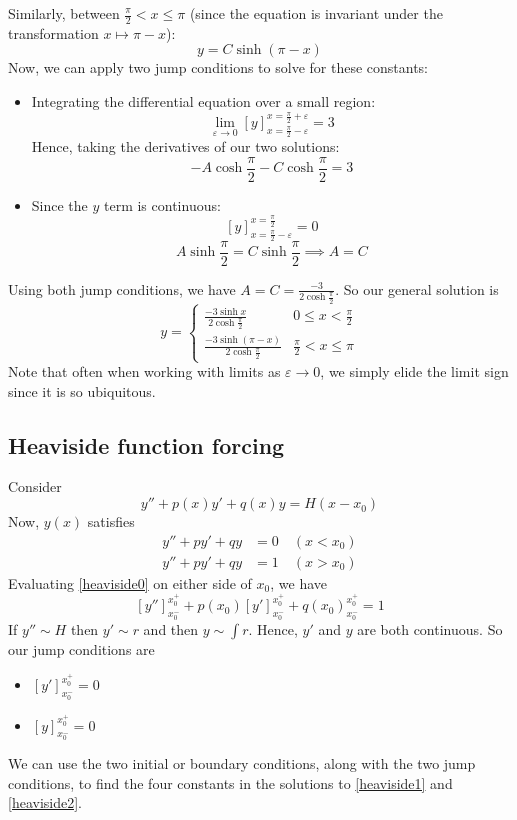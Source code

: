 Similarly, between \(\frac{\pi}{2} < x \leq \pi\) (since the equation is invariant under the transformation \(x \mapsto \pi - x\)):
\[
	y = C \sinh (\pi - x)
\]
Now, we can apply two jump conditions to solve for these constants:
\begin{itemize}
	\item Integrating the differential equation over a small region:
	      \[
		      \lim_{\varepsilon \to 0} [y]_{x = \frac{\pi}{2} - \varepsilon}^{x = \frac{\pi}{2} + \varepsilon} = 3
	      \]
	      Hence, taking the derivatives of our two solutions:
	      \[
		      -A\cosh\frac{\pi}{2} - C\cosh\frac{\pi}{2} = 3
	      \]
	\item Since the \(y\) term is continuous:
	      \[
		      [y]_{x = \frac{\pi}{2} - \varepsilon}^{x = \frac{\pi}{2}} = 0
	      \]
	      \[
		      A \sinh \frac{\pi}{2} = C \sinh \frac{\pi}{2} \implies A = C
	      \]
\end{itemize}
Using both jump conditions, we have \(A = C = \frac{-3}{2\cosh \frac{\pi}{2}}\).
So our general solution is
\[
	y = \begin{cases}
		\frac{-3\sinh x}{2\cosh \frac{\pi}{2}}         & 0 \leq x < \frac{\pi}{2}   \\
		\frac{-3\sinh (\pi - x)}{2\cosh \frac{\pi}{2}} & \frac{\pi}{2} < x \leq \pi
	\end{cases}
\]
Note that often when working with limits as \(\varepsilon \to 0\), we simply elide the limit sign since it is so ubiquitous.

\subsection{Heaviside function forcing}
Consider
\begin{equation}\label{heaviside0}
	y'' + p(x)y' + q(x)y = H(x - x_0)
\end{equation}
Now, \(y(x)\) satisfies
\begin{align}
	y'' + py' + qy & = 0\quad (x<x_0) \label{heaviside1} \\
	y'' + py' + qy & = 1\quad (x>x_0) \label{heaviside2}
\end{align}
Evaluating \eqref{heaviside0} on either side of \(x_0\), we have
\[
	[y'']_{x_0^-}^{x_0^+} + p(x_0)[y']_{x_0^-}^{x_0^+} + q(x_0)_{x_0^-}^{x_0^+} = 1
\]
If \(y'' \sim H\) then \(y' \sim r\) and then \(y \sim \int r\).
Hence, \(y'\) and \(y\) are both continuous.
So our jump conditions are
\begin{itemize}
	\item \([y']_{x_0^-}^{x_0^+} = 0\)
	\item \([y]_{x_0^-}^{x_0^+} = 0\)
\end{itemize}
We can use the two initial or boundary conditions, along with the two jump conditions, to find the four constants in the solutions to \eqref{heaviside1} and \eqref{heaviside2}.
